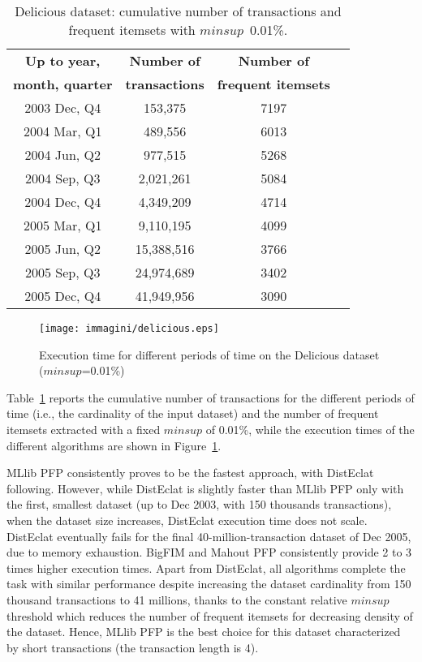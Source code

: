 \begin{table}[h]
\scriptsize
\begin{center}
\caption{Delicious dataset: cumulative number of transactions and frequent itemsets
with $minsup$~0.01\%.}
\label{delicious_itemsets}
\begin{tabular}{|c|c|c|c|}
\hline
{\bf Up to year,}	& {\bf Number of} 	& {\bf	Number of} \\
{\bf month, quarter}	& {\bf transactions} 	& {\bf	frequent itemsets} \\
\hline \hline
2003 Dec, Q4 	& 153,375	 	& 7197 \\ \hline
2004 Mar, Q1  	& 489,556		& 6013 \\ \hline
2004 Jun, Q2	& 977,515		& 5268 \\ \hline
2004 Sep, Q3 	& 2,021,261		& 5084 \\ \hline
2004 Dec, Q4 	& 4,349,209		& 4714 \\ \hline
2005 Mar, Q1	& 9,110,195		& 4099 \\ \hline
2005 Jun, Q2	& 15,388,516		& 3766 \\ \hline
2005 Sep, Q3	& 24,974,689		& 3402 \\ \hline
2005 Dec, Q4	& 41,949,956		& 3090 \\ \hline
\end{tabular}
\end{center}
\end{table}

\begin{figure}[!t]
\texttt{[image: immagini/delicious.eps]}
\caption{Execution time for different periods of time on the Delicious dataset
($minsup$=0.01\%)}
\label{delicious}
\end{figure}


Table~\ref{delicious_itemsets} reports the cumulative number of
transactions for the different periods of time
(i.e., the cardinality of the input dataset) and the
number of frequent itemsets extracted with a fixed $minsup$ of 0.01\%,
while the execution times of the
different algorithms are shown in Figure~\ref{delicious}.


MLlib PFP consistently proves to be the fastest approach, with DistEclat following.
However, while DistEclat is slightly faster than MLlib PFP only with the first, smallest dataset
(up to Dec 2003, with 150 thousands transactions), when the dataset size increases,
DistEclat execution time does not scale. DistEclat eventually fails for the final
40-million-transaction dataset of Dec 2005, due to memory exhaustion.
BigFIM and Mahout PFP consistently provide 2 to 3 times higher execution times.
Apart from DistEclat, all algorithms complete the task with similar performance
despite increasing the dataset cardinality from 150 thousand transactions to 41 millions,
thanks to the constant relative $minsup$ threshold
which reduces the number of frequent itemsets
for decreasing density of the dataset.
Hence, MLlib PFP is the best choice for this dataset characterized by short transactions
(the transaction length is 4).


